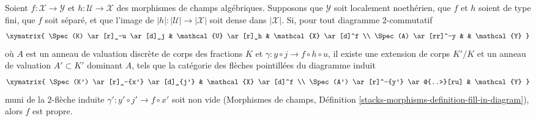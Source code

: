 \begin{lemma}
\label{lemma-refined-valuative-criterion-proper}
Soient $f : \mathcal{X} \to \mathcal{Y}$ et $h : \mathcal{U} \to \mathcal{X}$
des morphismes de champs algébriques. Supposons que $\mathcal{Y}$ soit
localement noethérien, que $f$ et $h$ soient de type fini,
que $f$ soit séparé, et que l'image de
$|h| : |\mathcal{U}| \to |\mathcal{X}|$ soit dense dans $|\mathcal{X}|$.
Si, pour tout diagramme $2$-commutatif
$$
\xymatrix{
\Spec(K) \ar[r]_-u \ar[d]_j & \mathcal{U} \ar[r]_h & \mathcal{X} \ar[d]^f \\
\Spec(A) \ar[rr]^-y & & \mathcal{Y}
}
$$
où $A$ est un anneau de valuation discrète de corps des fractions $K$
et $\gamma : y \circ j \to f \circ h \circ u$, il
existe une extension de corps $K'/K$ et un anneau de valuation $A' \subset K'$
dominant $A$, tels que la catégorie des flèches pointillées du
diagramme induit
$$
\xymatrix{
\Spec(K') \ar[r]_-{x'} \ar[d]_{j'} & \mathcal{X} \ar[d]^f \\
\Spec(A') \ar[r]^-{y'} \ar@{..>}[ru] & \mathcal{Y}
}
$$
muni de la $2$-flèche induite $\gamma' : y' \circ j' \to f \circ x'$
soit non vide (Morphismes de champs, Définition
\ref{stacks-morphisms-definition-fill-in-diagram}), alors $f$ est propre.
\end{lemma}

